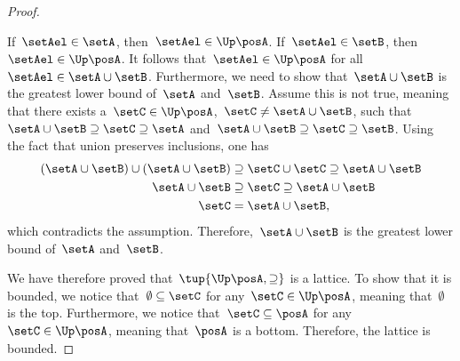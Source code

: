 \begin{proof}
\begin{compactitem}
    If~$\setAel\in \setA$, then~$\setAel\in \Up \posA$. If~$\setAel\in \setB$, then~$\setAel \in \Up \posA$.
    It follows that~$\setAel \in \Up \posA$ for all~$\setAel\in \setA\cup \setB$.
    Furthermore, we need to show that~$\setA\cup \setB$ is the greatest lower bound of~$\setA$ and~$\setB$.
    Assume this is not true, meaning that  there exists a~$\setC\in \Up \posA$,~$\setC\neq \setA\cup \setB$, such that~$\setA\cup \setB\supseteq \setC\supseteq \setA$ and~$\setA\cup \setB\supseteq \setC\supseteq \setB$.
    Using the fact that union preserves inclusions, one has
    \begin{equation}
      \begin{aligned}
      (\setA\cup \setB)
        \cup (\setA\cup \setB) &\supseteq \setC \cup \setC \supseteq \setA\cup \setB\\
        \setA\cup \setB &\supseteq \setC\supseteq \setA\cup \setB\\
        \setC&=\setA\cup \setB,
      \end{aligned}
    \end{equation}
    which contradicts the assumption. Therefore,~$\setA\cup \setB$ is the greatest lower bound of~$\setA$ and~$\setB$.
  \end{compactitem}
  We have therefore proved that~$\tup{\Up \posA,\supseteq}$ is a lattice.
  To show that it is bounded, we notice that~$\emptyset \subseteq \setC$ for any~$\setC\in \Up \posA$, meaning that~$\emptyset$ is the top.
  Furthermore, we notice that~$\setC\subseteq \posA$ for any~$\setC\in \Up \posA$, meaning that~$\posA$ is a bottom. Therefore, the lattice is bounded.
\end{proof}

